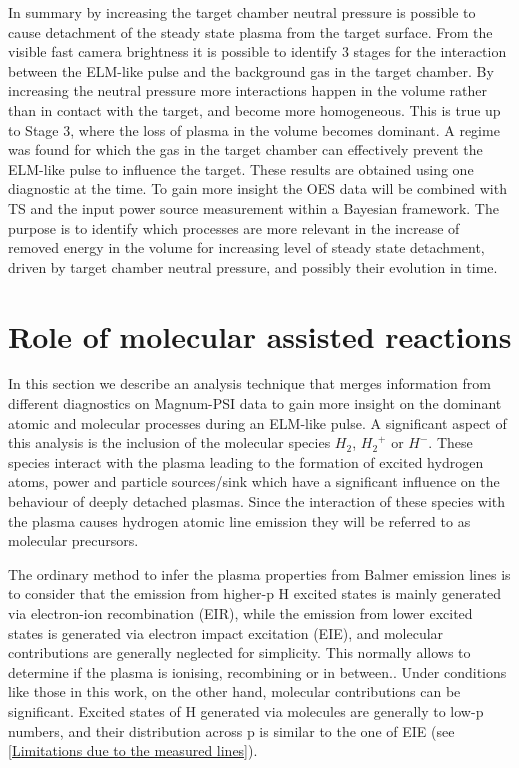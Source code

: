 In summary by increasing the target chamber neutral pressure is possible to cause detachment of the steady state plasma from the target surface. From the visible fast camera brightness it is possible to identify 3 stages for the interaction between the ELM-like pulse and the background gas in the target chamber. By increasing the neutral pressure more interactions happen in the volume rather than in contact with the target, and become more homogeneous. This is true up to Stage 3, where the loss of plasma in the volume becomes dominant. A regime was found for which the gas in the target chamber can effectively prevent the ELM-like pulse to influence the target.
These results are obtained using one diagnostic at the time. To gain more insight the OES data will be combined with TS and the input power source measurement within a Bayesian framework. The purpose is to identify which processes are more relevant in the increase of removed energy in the volume for increasing level of steady state detachment, driven by target chamber neutral pressure, and possibly their evolution in time.

\section{Role of molecular assisted reactions}\label{Role of molecular assisted reactions}
In this section we describe an analysis technique that merges information from different diagnostics on Magnum-PSI data to gain more insight on the dominant atomic and molecular processes during an ELM-like pulse. A significant aspect of this analysis is the inclusion of the molecular species $H_2$, ${H_2}^+$ or $H^-$. These species interact with the plasma leading to the formation of excited hydrogen atoms, power and particle sources/sink which have a significant influence on the behaviour of deeply detached plasmas. Since the interaction of these species with the plasma causes hydrogen atomic line emission they will be referred to as molecular precursors.

The ordinary method to infer the plasma properties from Balmer emission lines is to consider that the emission from higher-p H excited states is mainly generated via electron-ion recombination (EIR), while the emission from lower excited states is generated via electron impact excitation (EIE), and molecular contributions are generally neglected for simplicity. This normally allows to determine if the plasma is ionising, recombining or in between.\cite{Potzel2012,Verhaegh2019}. Under conditions like those in this work, on the other hand, molecular contributions can be significant.\cite{Akkermans2020} Excited states of H generated via molecules are generally to low-p numbers, and their distribution across p is similar to the one of EIE (see \autoref{Limitations due to the measured lines}). 


